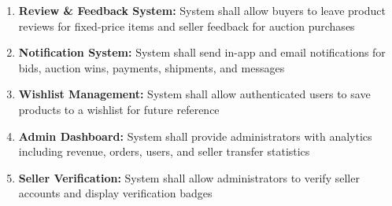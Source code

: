 \documentclass[12pt,a4paper]{article}
\begin{document}
\begin{enumerate}[leftmargin=*]
    \item \textbf{Review \& Feedback System:} System shall allow buyers to leave product reviews for fixed-price items and seller feedback for auction purchases
    
    \item \textbf{Notification System:} System shall send in-app and email notifications for bids, auction wins, payments, shipments, and messages
    
    \item \textbf{Wishlist Management:} System shall allow authenticated users to save products to a wishlist for future reference
    
    \item \textbf{Admin Dashboard:} System shall provide administrators with analytics including revenue, orders, users, and seller transfer statistics
    
    \item \textbf{Seller Verification:} System shall allow administrators to verify seller accounts and display verification badges
\end{enumerate}
\end{document}
